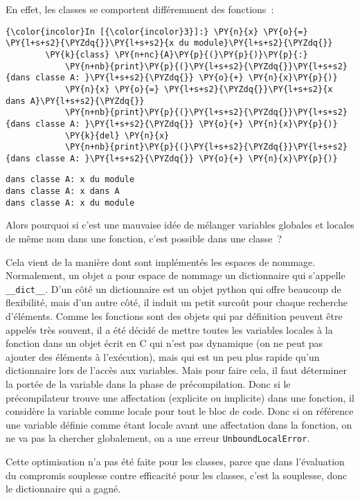 En effet, les classes se comportent différemment des fonctions~:

    \begin{Verbatim}[commandchars=\\\{\}]
{\color{incolor}In [{\color{incolor}3}]:} \PY{n}{x} \PY{o}{=} \PY{l+s+s2}{\PYZdq{}}\PY{l+s+s2}{x du module}\PY{l+s+s2}{\PYZdq{}}
        \PY{k}{class} \PY{n+nc}{A}\PY{p}{(}\PY{p}{)}\PY{p}{:}
            \PY{n+nb}{print}\PY{p}{(}\PY{l+s+s2}{\PYZdq{}}\PY{l+s+s2}{dans classe A: }\PY{l+s+s2}{\PYZdq{}} \PY{o}{+} \PY{n}{x}\PY{p}{)}
            \PY{n}{x} \PY{o}{=} \PY{l+s+s2}{\PYZdq{}}\PY{l+s+s2}{x dans A}\PY{l+s+s2}{\PYZdq{}}
            \PY{n+nb}{print}\PY{p}{(}\PY{l+s+s2}{\PYZdq{}}\PY{l+s+s2}{dans classe A: }\PY{l+s+s2}{\PYZdq{}} \PY{o}{+} \PY{n}{x}\PY{p}{)}
            \PY{k}{del} \PY{n}{x}
            \PY{n+nb}{print}\PY{p}{(}\PY{l+s+s2}{\PYZdq{}}\PY{l+s+s2}{dans classe A: }\PY{l+s+s2}{\PYZdq{}} \PY{o}{+} \PY{n}{x}\PY{p}{)}
\end{Verbatim}


    \begin{Verbatim}[commandchars=\\\{\}]
dans classe A: x du module
dans classe A: x dans A
dans classe A: x du module

    \end{Verbatim}

    Alors pourquoi si c'est une mauvaise idée de mélanger variables globales
et locales de même nom dans une fonction, c'est possible dans une
classe~?

Cela vient de la manière dont sont implémentés les espaces de nommage.
Normalement, un objet a pour espace de nommage un dictionnaire qui
s'appelle \texttt{\_\_dict\_\_}. D'un côté un dictionnaire est un objet
python qui offre beaucoup de flexibilité, mais d'un autre côté, il
induit un petit surcoût pour chaque recherche d'éléments. Comme les
fonctions sont des objets qui par définition peuvent être appelés très
souvent, il a été décidé de mettre toutes les variables locales à la
fonction dans un objet écrit en C qui n'est pas dynamique (on ne peut
pas ajouter des éléments à l'exécution), mais qui est un peu plus rapide
qu'un dictionnaire lors de l'accès aux variables. Mais pour faire cela,
il faut déterminer la portée de la variable dans la phase de
précompilation. Donc si le précompilateur trouve une affectation
(explicite ou implicite) dans une fonction, il considère la variable
comme locale pour tout le bloc de code. Donc si on référence une
variable définie comme étant locale avant une affectation dans la
fonction, on ne va pas la chercher globalement, on a une erreur
\texttt{UnboundLocalError}.

Cette optimisation n'a pas été faite pour les classes, parce que dans
l'évaluation du compromis souplesse contre efficacité pour les classes,
c'est la souplesse, donc le dictionnaire qui a gagné.


    
    
    
